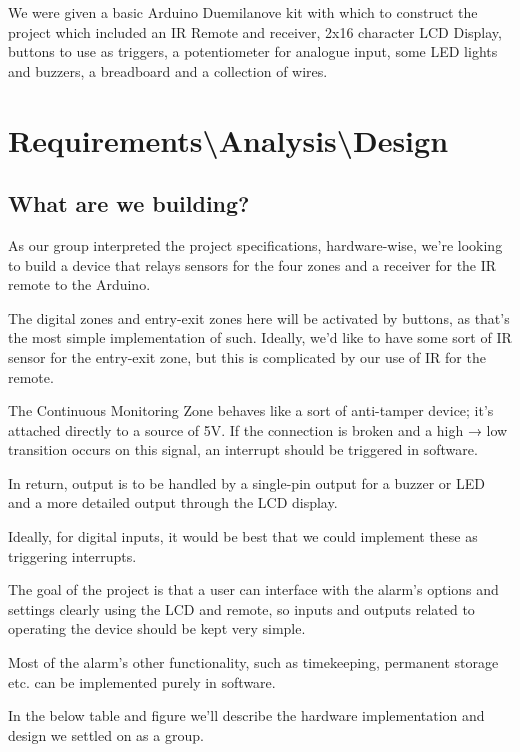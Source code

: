 \documentclass[a4paper,11pt]{article}
\theoremstyle{mytheor}
\begin{document}
We were given a basic Arduino Duemilanove kit with which to construct the project which included an IR Remote and receiver, 2x16 character LCD Display, buttons to use as triggers, a potentiometer for analogue input, some LED lights and buzzers, a breadboard and a collection of wires.
\newpage
\section{Requirements\textbackslash Analysis\textbackslash Design}

\subsection{What are we building?}

As our group interpreted the project specifications, hardware-wise, we're looking to build a device that relays sensors for the four zones and a receiver for the IR remote to the Arduino.

The digital zones and entry-exit zones here will be activated by buttons, as that's the most simple implementation of such. Ideally, we'd like to have some sort of IR sensor for the entry-exit zone, but this is complicated by our use of IR for the remote.

The Continuous Monitoring Zone behaves like a sort of anti-tamper device; it's attached directly to a source of 5V. If the connection is broken and a high → low transition occurs on this signal, an interrupt should be triggered in software.

In return, output is to be handled by a single-pin output for a buzzer or LED and a more detailed output through the LCD display.

Ideally, for digital inputs, it would be best that we could implement these as triggering interrupts.

The goal of the project is that a user can interface with the alarm's options and settings clearly using the LCD and remote, so inputs and outputs related to operating the device should be kept very simple.

Most of the alarm's other functionality, such as timekeeping, permanent storage etc. can be implemented purely in software.

In the below table and figure we'll describe the hardware implementation and design we settled on as a group.
\end{document}
